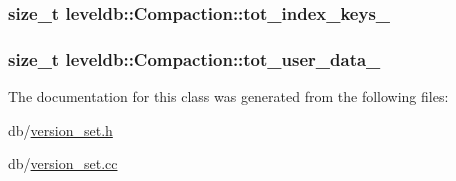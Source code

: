 \subsubsection[{tot\+\_\+index\+\_\+keys\+\_\+}]{\setlength{\rightskip}{0pt plus 5cm}size\+\_\+t leveldb\+::\+Compaction\+::tot\+\_\+index\+\_\+keys\+\_\+\hspace{0.3cm}{\ttfamily [private]}}\label{classleveldb_1_1_compaction_a7d801aaee909732013b2e1afc7719ac9}
\hypertarget{classleveldb_1_1_compaction_a1608b09c74f5c330ac573368964e74e7}{}
\subsubsection[{tot\+\_\+user\+\_\+data\+\_\+}]{\setlength{\rightskip}{0pt plus 5cm}size\+\_\+t leveldb\+::\+Compaction\+::tot\+\_\+user\+\_\+data\+\_\+\hspace{0.3cm}{\ttfamily [private]}}\label{classleveldb_1_1_compaction_a1608b09c74f5c330ac573368964e74e7}


The documentation for this class was generated from the following files\+:\begin{DoxyCompactItemize}
\item 
db/\hyperlink{version__set_8h}{version\+\_\+set.\+h}\item 
db/\hyperlink{version__set_8cc}{version\+\_\+set.\+cc}\end{DoxyCompactItemize}
